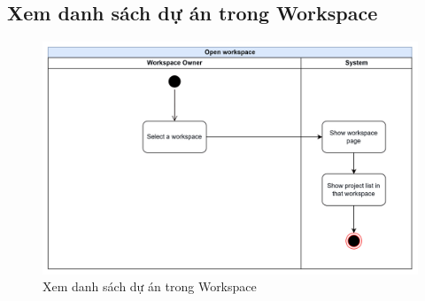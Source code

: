 \subsection{Xem danh sách dự án trong Workspace}
    \begin{figure}[H]
        \centering
        \includegraphics[width=\linewidth]{Content/Phân tích và thiết kế hệ thống/documents/Sơ đồ hoạt động/images/openWorkspace.png}
        \vspace{0.5cm}
        \caption{Xem danh sách dự án trong Workspace}
        \label{fig:Xem danh sách dự án trong Workspace}
    \end{figure}
